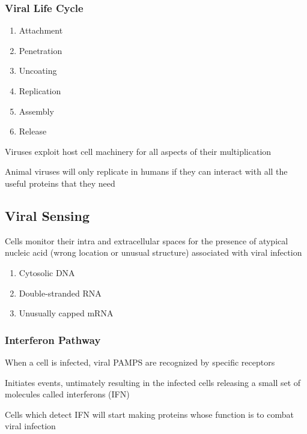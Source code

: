 \documentclass{notes}
\begin{document}
\subsubsection{Viral Life Cycle}

\begin{enumerate}
    \item Attachment
    \item Penetration
    \item Uncoating
    \item Replication
    \item Assembly
    \item Release
\end{enumerate}


Viruses exploit host cell machinery for all aspects of their multiplication

\tab \indicates Animal viruses will only replicate in humans if they can interact with all the useful proteins that they need

\subsection{Viral Sensing}

Cells monitor their intra and extracellular spaces for the presence of atypical nucleic acid (wrong location or unusual structure) associated with viral infection

\begin{enumerate}
    \item Cytosolic DNA
    \item Double-stranded RNA
    \item Unusually capped mRNA
\end{enumerate}

\subsubsection{Interferon Pathway}

When a cell is infected, viral PAMPS are recognized by specific receptors

\tab \indicates Initiates events, untimately resulting in the infected cells releasing a small set of molecules called interferons (IFN)

\tab \indicates Cells which detect IFN will start making proteins whose function is to combat viral infection
\end{document}
